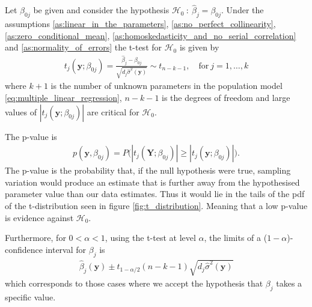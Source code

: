\begin{theorem}  \label{th:t_distribution}
Let $\beta_{0j}$ be given and consider the hypothesis $\mathcal{H}_0 \ : \ \hat{\beta}_j=\beta_{0j}$. Under the assumptions \ref{as:linear_in_the_parameters}, \ref{as:no_perfect_collinearity}, \ref{as:zero_conditional_mean}, \ref{as:homoskedasticity_and_no_serial_correlation} and \ref{as:normality_of_errors} the t-test for $\mathcal{H}_0$ is given by
\begin{align}\label{eq:t-test}
   t_j(\textbf{y};\beta_{0j}) = \frac{\hat{\beta}_j - \beta_{0j}}{\sqrt{d_j\hat{\sigma}^2(\textbf{y})}}\sim t_{n-k-1}, \quad \text{for} \ j=1,\ldots,k
\end{align}
where $k+1$ is the number of unknown parameters in the population model \eqref{eq:multiple_linear_regression}, $n-k-1$ is the degrees of freedom and large values of $|t_j(\textbf{y};\beta_{0j})|$ are critical for $\mathcal{H}_0$.

The p-value is
\begin{align}
    p(\textbf{y},\beta_{0j})=P\Big(|t_j(\textbf{Y};\beta_{0j})|\geq |t_j(\textbf{y};\beta_{0j})|\Big).
\end{align}
The p-value is the probability that, if the null hypothesis were true, sampling variation would produce an estimate that is further away from the hypothesised parameter value than our data estimates.  
Thus it would lie in the tails of the pdf of the t-distribution seen in figure \ref{fig:t_distribution}.
Meaning that a low p-value is evidence against $\mathcal{H}_0$.

Furthermore, for $0<\alpha<1$, using the t-test at level $\alpha$, the limits of a ($1-\alpha$)-confidence interval for $\beta_j$ is
\begin{align} \label{eq:t_statistic}
    \hat{\beta}_{j}(\textbf{y}) \pm t_{1-\alpha/2}(n-k-1)\sqrt{d_j\hat{\sigma}^2(\textbf{y})}
\end{align}
which corresponds to those cases where we accept the hypothesis that $\beta_j$ takes a specific value.
\end{theorem}
